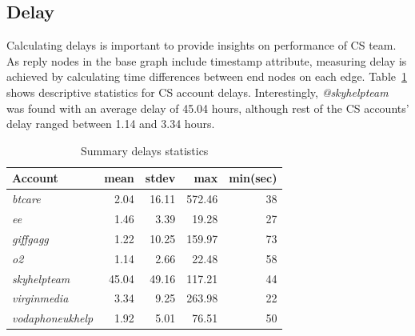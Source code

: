 \documentclass[sigconf]{acmart}
\begin{document}
{%


\subsection{Delay}\label{results_delay}

Calculating delays is important to provide insights on performance 
of CS team. As reply nodes in the base graph 
include timestamp attribute, measuring delay is achieved
by calculating time differences between end nodes on each
edge. Table~\ref{tbl:delaystats} shows descriptive statistics for CS
account delays. Interestingly, {\emph{@skyhelpteam}} was found with an
average delay of 45.04 hours, although rest of the CS accounts' delay
ranged between 1.14 and 3.34 hours.


\begin{table}[!h]
\centering
\begin{tabularx}{\columnwidth}{lrrrr}
\toprule
\textbf{Account} & \textbf{mean} & \textbf{stdev} & \textbf{max} & \textbf{min(sec)} \\ 
\midrule
{\emph{btcare}} & 2.04 & 16.11 & 572.46 & 38\\
{\emph{ee}} & 1.46 & 3.39 & 19.28 & 27\\
{\emph{giffgagg}} & 1.22 & 10.25 & 159.97 & 73\\ 
{\emph{o2}} & 1.14 & 2.66 & 22.48 & 58\\
{\emph{skyhelpteam}} & 45.04 & 49.16 & 117.21 & 44\\
{\emph{virginmedia}} & 3.34 & 9.25 & 263.98 & 22\\
{\emph{vodaphoneukhelp}} & 1.92 & 5.01 & 76.51 & 50\\
\bottomrule
\end{tabularx}
\caption{Summary delays statistics}
\label{tbl:delaystats}
\end{table}

}
\end{document}
